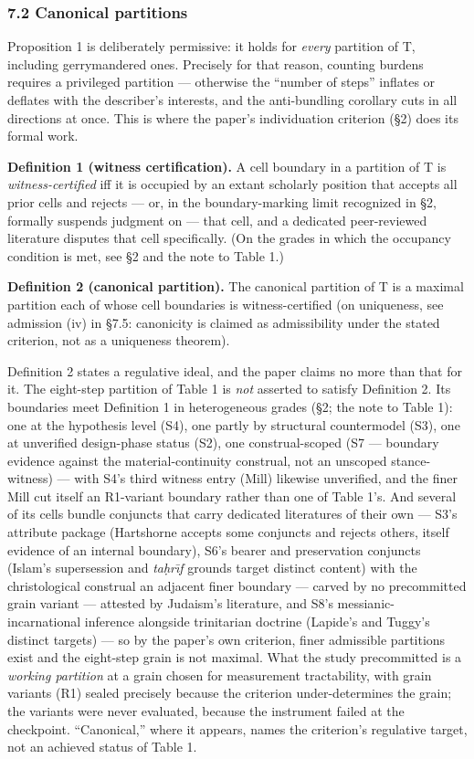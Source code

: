 \subsubsection{7.2 Canonical partitions}\label{canonical-partitions}

Proposition 1 is deliberately permissive: it holds for \emph{every} partition of T, including gerrymandered ones. Precisely for that reason, counting burdens requires a privileged partition --- otherwise the ``number of steps'' inflates or deflates with the describer's interests, and the anti-bundling corollary cuts in all directions at once. This is where the paper's individuation criterion (\S{}2) does its formal work.

\textbf{Definition 1 (witness certification).} A cell boundary in a partition of T is \emph{witness-certified} iff it is occupied by an extant scholarly position that accepts all prior cells and rejects --- or, in the boundary-marking limit recognized in \S{}2, formally suspends judgment on --- that cell, and a dedicated peer-reviewed literature disputes that cell specifically. (On the grades in which the occupancy condition is met, see \S{}2 and the note to Table 1.)

\textbf{Definition 2 (canonical partition).} The canonical partition of T is a maximal partition each of whose cell boundaries is witness-certified (on uniqueness, see admission (iv) in \S{}7.5: canonicity is claimed as admissibility under the stated criterion, not as a uniqueness theorem).

Definition 2 states a regulative ideal, and the paper claims no more than that for it. The eight-step partition of Table 1 is \emph{not} asserted to satisfy Definition 2. Its boundaries meet Definition 1 in heterogeneous grades (\S{}2; the note to Table 1): one at the hypothesis level (S4), one partly by structural countermodel (S3), one at unverified design-phase status (S2), one construal-scoped (S7 --- boundary evidence against the material-continuity construal, not an unscoped stance-witness) --- with S4's third witness entry (Mill) likewise unverified, and the finer Mill cut itself an R1-variant boundary rather than one of Table 1's. And several of its cells bundle conjuncts that carry dedicated literatures of their own --- S3's attribute package (Hartshorne accepts some conjuncts and rejects others, itself evidence of an internal boundary), S6's bearer and preservation conjuncts (Islam's supersession and \emph{ta\d{h}r\={\i}f} grounds target distinct content) with the christological construal an adjacent finer boundary --- carved by no precommitted grain variant --- attested by Judaism's literature, and S8's messianic-incarnational inference alongside trinitarian doctrine (Lapide's and Tuggy's distinct targets) --- so by the paper's own criterion, finer admissible partitions exist and the eight-step grain is not maximal. What the study precommitted is a \emph{working partition} at a grain chosen for measurement tractability, with grain variants (R1) sealed precisely because the criterion under-determines the grain; the variants were never evaluated, because the instrument failed at the checkpoint. ``Canonical,'' where it appears, names the criterion's regulative target, not an achieved status of Table 1.

